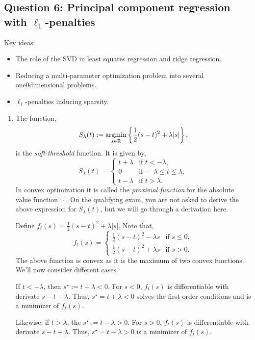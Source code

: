\subsection*{Question 6: Principal component regression with $\ell_1$-penalties}

Key ideas:
\begin{itemize}
    \item The role of the SVD in least squares regression and ridge regression.
    \item Reducing a multi-parameter optimization problem into several one0dimensional problems.
    \item $\ell_1$-penalties inducing sparsity.
\end{itemize}

\begin{enumerate}[label = (\alph*)]
    \item The function,
    \[S_\lambda(t) := \operatorname*{argmin}_{s \in \mathbb{R}} \left\{\frac{1}{2}(s-t)^2 + \lambda |s|\right\}, \]
    is the \emph{soft-threshold} function. It is given by,
    \[S_\lambda(t) = \begin{cases}
        t+\lambda &\text{if } t <-\lambda,\\
        0 & \text{if } -\lambda \le t \le \lambda, \\
        t-\lambda & \text{if } t  > \lambda.
    \end{cases} \] 
    In convex optimization it is called the \emph{proximal function} for the absolute value function $|\cdot|$. On the qualifying exam, you are not asked to derive the above expression for $S_\lambda(t)$, but we will go through a derivation here.

    Define $f_t(s) = \frac{1}{2}(s-t)^2 + \lambda |s|$. Note that,
    \[f_t(s) = \begin{cases}
        \frac{1}{2}(s-t)^2 - \lambda s & \text{if } s \le 0,\\
        \frac{1}{2}(s-t)^2 + \lambda s & \text{if } s > 0.
    \end{cases} \]
    The above function is convex as it is the maximum of two convex functions. We'll now consider different cases. 
    
    If $t < -\lambda$, then $s^\star := t+\lambda < 0$. For $s<0$, $f_t(s)$ is differentiable with derivate $s-t - \lambda$. Thus, $s^\star = t+\lambda<0$ solves the first order conditions and is a minimizer of $f_t(s)$.

    Likewise, if $t>\lambda$, the $s^\star := t-\lambda > 0$. For $s>0$, $f_t(s)$ is differentiable with derivate $s-t+\lambda$. Thus, $s^\star = t-\lambda >0$ is a minimizer of $f_t(s)$. 


\end{enumerate}
